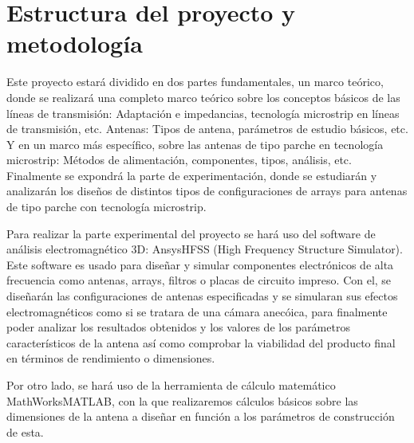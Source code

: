 \section{Estructura del proyecto y metodología}

\par Este proyecto estará dividido en dos partes fundamentales, un marco teórico, donde se realizará una completo marco teórico sobre los conceptos básicos de las líneas de transmisión: Adaptación e impedancias, tecnología microstrip en líneas de transmisión, etc. Antenas: Tipos de antena, parámetros de estudio básicos, etc. Y en un marco más específico, sobre las antenas de tipo parche en tecnología microstrip: Métodos de alimentación, componentes, tipos, análisis, etc. Finalmente se expondrá la parte de experimentación, donde se estudiarán y analizarán los diseños de distintos tipos de configuraciones de arrays para antenas de tipo parche con tecnología microstrip.
\\
\par Para realizar la parte experimental del proyecto se hará uso del software de análisis electromagnético 3D: Ansys\sffamily\textregistered  HFSS (High Frequency Structure Simulator). Este software es usado para diseñar y simular componentes electrónicos de alta frecuencia como antenas, arrays, filtros o placas de circuito impreso. Con el, se diseñarán las configuraciones de antenas especificadas y se simularan sus efectos electromagnéticos como si se tratara de una cámara anecóica, para finalmente poder analizar los resultados obtenidos y los valores de los parámetros característicos de la antena así como comprobar la viabilidad del producto final en términos de rendimiento o dimensiones.
\\
\par Por otro lado, se hará uso de la herramienta de cálculo matemático MathWorks\sffamily\textregistered  MATLAB, con la que realizaremos cálculos básicos sobre las dimensiones de la antena a diseñar en función a los parámetros de construcción de esta.
